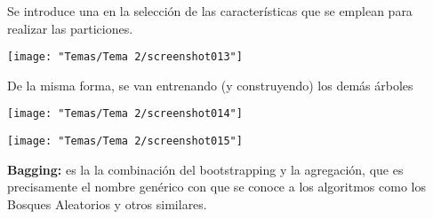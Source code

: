 Se introduce una  en la selección de las características que se emplean para realizar las particiones.
\begin{center}
	\texttt{[image: "Temas/Tema 2/screenshot013"]}
\end{center}

\begin{minipage}{0.5\textwidth}
	De la misma forma, se van entrenando (y construyendo) los demás árboles
\end{minipage}\quad\begin{minipage}{0.5\textwidth}
\begin{center}
	\texttt{[image: "Temas/Tema 2/screenshot014"]}
\end{center}

\end{minipage}
\begin{center}
	\texttt{[image: "Temas/Tema 2/screenshot015"]}
\end{center}

\textbf{Bagging:} es la la combinación del bootstrapping y la agregación, que es precisamente el nombre genérico con que se conoce a los algoritmos como los Bosques Aleatorios y otros similares.

